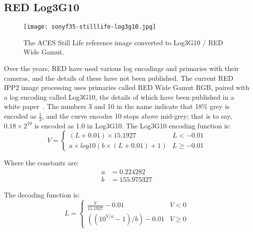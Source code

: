 \subsection{RED Log3G10}%
\label{subsec:red-log3g10}

\begin{figure}[H]
    \texttt{[image: sonyf35-stilllife-log3g10.jpg]}
    \caption{
        The ACES Still Life reference image converted to Log3G10 / RED Wide Gamut.\newline
        \ccCopyrightAmpas
    }%
    \label{fig:stilllife-log3g10}
\end{figure}

Over the years, RED have used various log encodings and primaries with their cameras, and the details of these have not been published.
The current RED IPP2 image processing uses primaries called RED Wide Gamut RGB, paired with a log encoding called Log3G10, the details of which have been published in a white paper~\parencite{}.
The numbers 3 and 10 in the name indicate that 18\% grey is encoded as \(\frac{1}{3}\), and the curve encodes 10 stops above mid-grey; that is to say, \(0.18 \times 2^{10}\) is encoded as 1.0 in Log3G10.
\ccPar{}
The Log3G10 encoding function is:
\begin{equation}
    V =
    \begin{cases}
        (L + 0.01) \times 15.1927 & L < -0.01 \\
        a \times log10(b \times (L + 0.01) + 1) & L \geq -0.01
    \end{cases}
\end{equation}

Where the constants are:
\begin{align}
    a &= 0.224282 \nonumber \\
    b &= 155.975327 \nonumber
\end{align}

\begin{figure}[H]
    \label{fig:red-log3g10}
\end{figure}

The decoding function is:
\begin{equation}
    L =
    \begin{cases}
        \frac{V}{15.1927} - 0.01 & V < 0 \\
        ((10^{V / a} - 1) / b) - 0.01 & V \geq 0
    \end{cases}
\end{equation}

